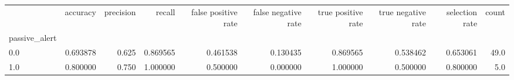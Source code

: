 \begin{tabular}{lrrrrrrrrr}
\toprule
{} &  accuracy &  precision &    recall &  false positive rate &  false negative rate &  true positive rate &  true negative rate &  selection rate &  count \\
passive\_alert &           &            &           &                      &                      &                     &                     &                 &        \\
\midrule
0.0           &  0.693878 &      0.625 &  0.869565 &             0.461538 &             0.130435 &            0.869565 &            0.538462 &        0.653061 &   49.0 \\
1.0           &  0.800000 &      0.750 &  1.000000 &             0.500000 &             0.000000 &            1.000000 &            0.500000 &        0.800000 &    5.0 \\
\bottomrule
\end{tabular}
